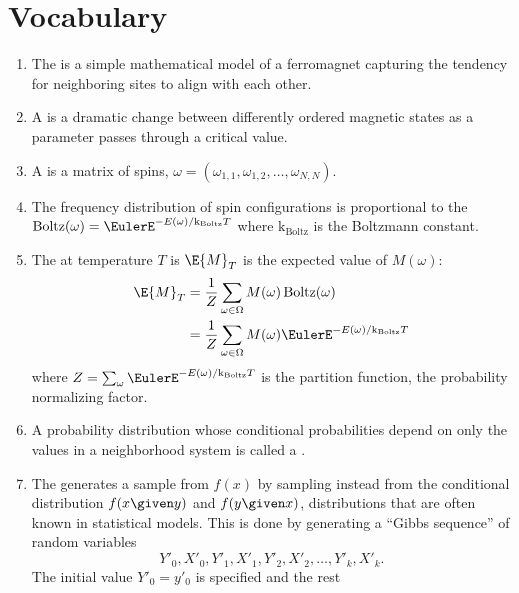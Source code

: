 \documentclass[12pt]{article}
\newcommand{\kT}{{\text k}_{\text{Boltz}}T}
\begin{document}
\section*{Vocabulary}
\begin{enumerate}
    \item
        The  is a simple mathematical model of a
        ferromagnet capturing the tendency for neighboring sites to
        align with each other.
    \item
        A  is a dramatic change between
        differently ordered magnetic states as a parameter
        passes through a critical value.
    \item
        A  is a matrix of spins, \( \omega = (\omega_
        {1,1}, \omega_{1,2}, \dots, \omega_{N,N}) \).
    \item
        The frequency distribution of spin configurations is
        proportional to the  \(
        \operatorname{Boltz}
        (\omega) = \EulerE^{-E(\omega)/\kT} \) where \( \text{k}_{\text{Boltz}} \) is the
        Boltzmann constant.
    \item
        The  at temperature \( T \) is \( \E{M}_T \)
        is the expected value of \( M(\omega) \):
        \begin{align*}
            \E{M}_T &= \frac{1}{Z} \sum\limits_{\omega \in \Omega} M(\omega)
            \operatorname{Boltz}
            (\omega) \\
            &= \frac{1}{Z} \sum\limits_{\omega \in \Omega} M(\omega)
            \EulerE^{-E(\omega)/\kT}
        \end{align*}
        where \( Z = \sum_{\omega} \EulerE^{-E(\omega)/\kT} \) is the
        partition function, the probability normalizing factor.
    \item
        A probability distribution whose conditional probabilities
        depend on only the values in a neighborhood system is called a
        .
    \item
        The  generates a sample from \( f(x) \) by sampling
        instead from the conditional distribution \( f(x \given y) \)
        and \( f(y \given x) \), distributions that are often known in
        statistical models.  This is done by generating a ``Gibbs
        sequence'' of random variables
        \[
            Y'_0, X'_0, Y'_1, X'_1, Y'_2, X'_2, \dots, Y'_k, X'_k.
        \] The initial value \( Y'_0 = y'_0 \) is specified and the rest

\end{enumerate}
\end{document}
